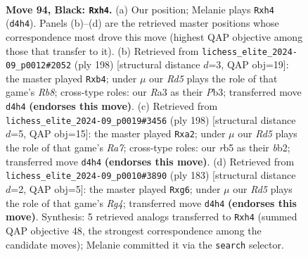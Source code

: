 \documentclass[11pt]{article}
\begin{document}
\clearpage

\begin{figure}[p]\centering
\begin{subfigure}{0.46\textwidth}\centering
\resizebox{\linewidth}{!}{%
\newchessgame
\chessboard[
  setfen={8/2k5/8/1R6/3r3P/r7/5K2/8 b - - 30 94},
  showmover=false,
  pgfstyle=straightmove, color=movearrow, markmove={d4-h4}
]}
\caption{}
\end{subfigure}\hfill
\begin{subfigure}{0.46\textwidth}\centering
\resizebox{\linewidth}{!}{%
\newchessgame
\chessboard[
  setfen={1R6/8/8/5k2/1p6/1P6/4r3/2K5 w - - 33 100},
  showmover=false,
  pgfstyle=straightmove, color=movearrow, markmove={b8-b4}
]}
\caption{}
\end{subfigure}
\\[4pt]
\begin{subfigure}{0.46\textwidth}\centering
\resizebox{\linewidth}{!}{%
\newchessgame
\chessboard[
  setfen={5k2/R7/8/8/4K3/8/pb6/8 w - - 2 100},
  showmover=false,
  pgfstyle=straightmove, color=movearrow, markmove={a7-a2}
]}
\caption{}
\end{subfigure}\hfill
\begin{subfigure}{0.46\textwidth}\centering
\resizebox{\linewidth}{!}{%
\newchessgame
\chessboard[
  setfen={1R6/4k3/6P1/6r1/8/8/8/5K2 b - - 16 92},
  showmover=false,
  pgfstyle=straightmove, color=movearrow, markmove={g5-g6}
]}
\caption{}
\end{subfigure}
\caption{\textbf{Move 94, Black: \texttt{Rxh4}.} (a) Our position; Melanie plays \texttt{Rxh4} (\texttt{d4h4}). Panels (b)--(d) are the retrieved master positions whose correspondence most drove this move (highest QAP objective among those that transfer to it). (b) Retrieved from \texttt{lichess\_elite\_2024-09\_p0012\#2052} (ply 198) [structural distance $d$=3, QAP obj=19]: the master played \texttt{Rxb4}; under $\mu$ our \emph{Rd5} plays the role of that game's \emph{Rb8}; cross-type roles: our \emph{R}a3 as their \emph{P}b3; transferred move \texttt{d4h4} \textbf{(endorses this move)}. (c) Retrieved from \texttt{lichess\_elite\_2024-09\_p0019\#3456} (ply 198) [structural distance $d$=5, QAP obj=15]: the master played \texttt{Rxa2}; under $\mu$ our \emph{Rd5} plays the role of that game's \emph{Ra7}; cross-type roles: our \emph{r}b5 as their \emph{b}b2; transferred move \texttt{d4h4} \textbf{(endorses this move)}. (d) Retrieved from \texttt{lichess\_elite\_2024-09\_p0010\#3890} (ply 183) [structural distance $d$=2, QAP obj=5]: the master played \texttt{Rxg6}; under $\mu$ our \emph{Rd5} plays the role of that game's \emph{Rg4}; transferred move \texttt{d4h4} \textbf{(endorses this move)}. Synthesis: 5 retrieved analogs transferred to \texttt{Rxh4} (summed QAP objective 48, the strongest correspondence among the candidate moves); Melanie committed it via the \texttt{search} selector.}
\label{fig:thought-m187}
\end{figure}
\end{document}
